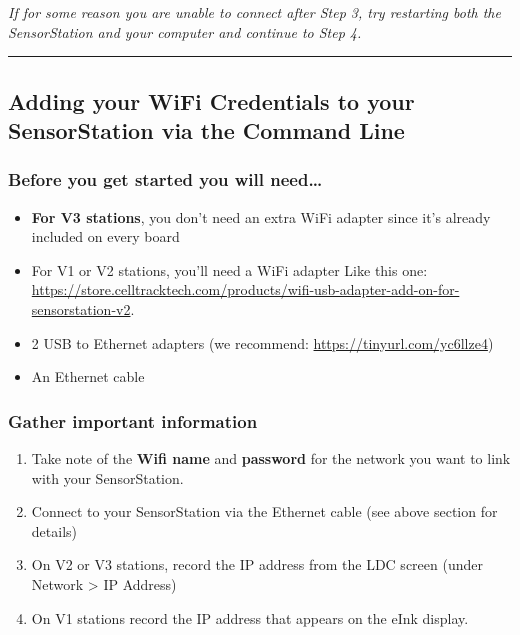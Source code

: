 \documentclass[
]{article}
\providecommand{\tightlist}{%
  \setlength{\itemsep}{0pt}\setlength{\parskip}{0pt}}
\begin{document}
\emph{If for some reason you are unable to connect after Step 3, try
restarting both the SensorStation and your computer and continue to Step
4.}

\begin{center}\rule{0.5\linewidth}{0.5pt}\end{center}

\hypertarget{adding-your-wifi-credentials-to-your-sensorstation-via-the-command-line}{%
\subsection{Adding your WiFi Credentials to your SensorStation via the
Command
Line}\label{adding-your-wifi-credentials-to-your-sensorstation-via-the-command-line}}

\hypertarget{before-you-get-started-you-will-need-1}{%
\subsubsection{Before you get started you will
need\ldots{}}\label{before-you-get-started-you-will-need-1}}

\begin{itemize}
\tightlist
\item
  \textbf{For V3 stations}, you don't need an extra WiFi adapter since
  it's already included on every board
\item
  For V1 or V2 stations, you'll need a WiFi adapter Like this one:
  \url{https://store.celltracktech.com/products/wifi-usb-adapter-add-on-for-sensorstation-v2}.
\item
  2 USB to Ethernet adapters (we recommend:
  \url{https://tinyurl.com/yc6llze4})
\item
  An Ethernet cable
\end{itemize}

\hypertarget{gather-important-information}{%
\subsubsection{Gather important
information}\label{gather-important-information}}

\begin{enumerate}
\def\labelenumi{\arabic{enumi}.}
\tightlist
\item
  Take note of the \textbf{Wifi name} and \textbf{password} for the
  network you want to link with your SensorStation.
\item
  Connect to your SensorStation via the Ethernet cable (see above
  section for details)
\item
  On V2 or V3 stations, record the IP address from the LDC screen (under
  Network \textgreater{} IP Address)
\item
  On V1 stations record the IP address that appears on the eInk display.
\end{enumerate}
\end{document}
